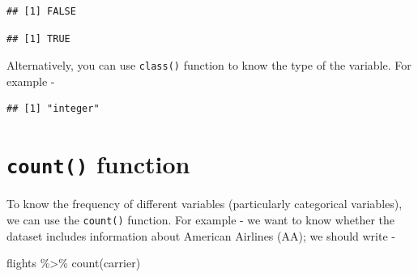 \documentclass[
]{book}
\newenvironment{Shaded}{\begin{snugshade}}{\end{snugshade}}
\newcommand{\FunctionTok}[1]{\textcolor[rgb]{0.00,0.00,0.00}{#1}}
\newcommand{\NormalTok}[1]{#1}
\newcommand{\SpecialCharTok}[1]{\textcolor[rgb]{0.00,0.00,0.00}{#1}}
\begin{document}
\begin{Shaded}
\end{Shaded}

\begin{verbatim}
## [1] FALSE
\end{verbatim}

\begin{Shaded}
\end{Shaded}

\begin{verbatim}
## [1] TRUE
\end{verbatim}

Alternatively, you can use \texttt{class()} function to know the type of the variable. For example -

\begin{Shaded}
\end{Shaded}

\begin{verbatim}
## [1] "integer"
\end{verbatim}

\hypertarget{count-function}{%
\section{\texorpdfstring{\texttt{count()} function}{count() function}}\label{count-function}}

To know the frequency of different variables (particularly categorical variables), we can use the \texttt{count()} function. For example - we want to know whether the dataset includes information about American Airlines (AA); we should write -

\begin{Shaded}
\begin{Highlighting}[]
\NormalTok{flights }\SpecialCharTok{\%\textgreater{}\%} 
  \FunctionTok{count}\NormalTok{(carrier)}
\end{Highlighting}
\end{Shaded}
\end{document}
